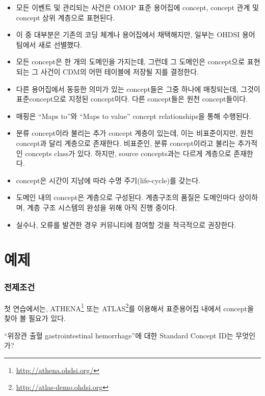 \documentclass[11pt]{book}
\providecommand{\tightlist}{%
  \setlength{\itemsep}{0pt}\setlength{\parskip}{0pt}}
\let\rmarkdownfootnote\footnote%
\def\footnote{\protect\rmarkdownfootnote}
\theoremstyle{definition}
\theoremstyle{definition}
\theoremstyle{definition}
\theoremstyle{remark}
\let\BeginKnitrBlock\begin \let\EndKnitrBlock\end
\begin{document}
\BeginKnitrBlock{rmdsummary}
\begin{itemize}
\tightlist
\item
  모든 이벤트 및 관리되는 사건은 OMOP 표준 용어집에 concept, concept
  관계 및 concept 상위 계층으로 표현된다.
\item
  이 중 대부분은 기존의 코딩 체계나 용어집에서 채택해지만, 일부는 OHDSI
  용어팀에서 새로 선별했다.
\item
  모든 concept은 한 개의 도메인을 가지는데, 그런데 그 도메인은
  concept으로 표현되는 그 사건이 CDM의 어떤 테이블에 저장될 지를
  결정한다.
\item
  다른 용어집에서 동등한 의미가 있는 concept들은 그중 하나에 매칭되는데,
  그것이 표준concept으로 지정된 concept이다. 다른 concept들은 원천
  concept들이다.
\item
  매핑은 ``Maps to''와 ``Maps to value'' concept relationships을 통해
  수행된다.
\item
  분류 concept이라 불리는 추가 concept 계층이 있는데, 이는 비표준이지만,
  원천 concept과 달리 계층으로 존재한다. 비표준인, 분류 concept이라고
  불리는 추가적인 concepts class가 있다. 하지만, source concepts과는
  다르게 계층으로 존재한다.
\item
  concept은 시간이 지남에 따라 수명 주기(life-cycle)를 갖는다.
\item
  도메인 내의 concept은 계층으로 구성된다. 계층구조의 품질은 도메인마다
  상이하며, 계층 구조 시스템의 완성을 위해 아직 진행 중이다.
\item
  실수나, 오류를 발견한 경우 커뮤니티에 참여할 것을 적극적으로 권장한다.
\end{itemize}
\EndKnitrBlock{rmdsummary}

\section{예제}\label{-1}

\subsubsection*{전제조건}

첫 연습에서는, ATHENA\footnote{\url{http://athena.ohdsi.org/}} 또는
ATLAS\footnote{\url{http://atlas-demo.ohdsi.org}}를 이용해서 표준용어집
내에서 concept을 찾아 볼 필요가 있다.

\BeginKnitrBlock{exercise}
\protect\hypertarget{exr:exerciseVocab1}{}{\label{exr:exerciseVocab1}
}``위장관 출혈 gastrointestinal hemorrhage''에 대한 Standard Concept
ID는 무엇인가?
\EndKnitrBlock{exercise}
\end{document}
